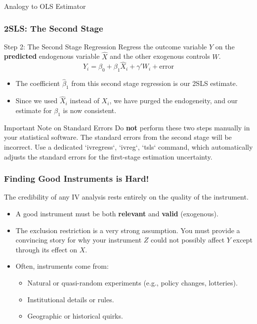\documentclass[
  ignorenonframetext,
  aspectratio=169]{beamer}
\begin{document}
\begin{frame}{Analogy to OLS Estimator}
\begin{frame}
\frametitle{2SLS: The Second Stage}
\begin{block}{Step 2: The Second Stage Regression}
Regress the outcome variable $Y$ on the \textbf{predicted} endogenous variable $\hat{X}$ and the other exogenous controls $W$.
\[ Y_i = \beta_0 + \beta_1 \hat{X}_i + \gamma' W_i + \text{error} \]
\end{block}
\pause
\begin{itemize}
    \item The coefficient $\hat{\beta}_1$ from this second stage regression is our 2SLS estimate.
    \item Since we used $\hat{X}_i$ instead of $X_i$, we have purged the endogeneity, and our estimate for $\beta_1$ is now consistent.
\end{itemize}
\pause
\begin{alertblock}{Important Note on Standard Errors}
Do \textbf{not} perform these two steps manually in your statistical software. The standard errors from the second stage will be incorrect. Use a dedicated `ivregress`, `ivreg`, `tsls` command, which automatically adjusts the standard errors for the first-stage estimation uncertainty.
\end{alertblock}
\end{frame}

\begin{frame}
\frametitle{Finding Good Instruments is Hard!}
The credibility of any IV analysis rests entirely on the quality of the instrument.
\begin{itemize}
    \item A good instrument must be both \textbf{relevant} and \textbf{valid} (exogenous).
    \item The exclusion restriction is a very strong assumption. You must provide a convincing story for why your instrument $Z$ could not possibly affect $Y$ except through its effect on $X$.
    \item Often, instruments come from:
    \begin{itemize}
        \item Natural or quasi-random experiments (e.g., policy changes, lotteries).
        \item Institutional details or rules.
        \item Geographic or historical quirks.
    \end{itemize}
\end{itemize}
\end{frame}


\end{frame}
\end{document}
